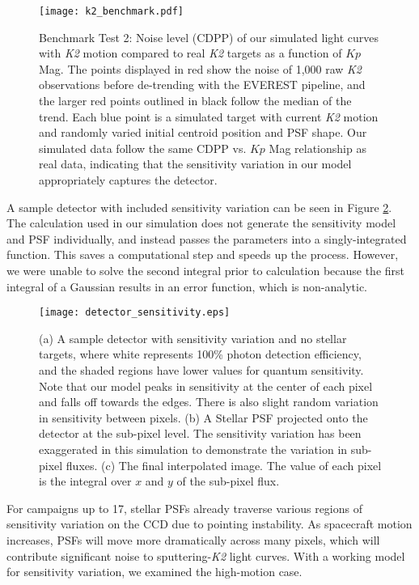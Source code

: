 \documentclass[12pt,preprint]{aastex}
\begin{document}
\begin{figure}[h]
	\centering
	\texttt{[image: k2\_benchmark.pdf]}
	\caption{Benchmark Test 2: Noise level (CDPP) of our simulated light curves with \textit{K2} motion compared to real \textit{K2} targets as a function of $Kp$ Mag. The points displayed in red show the noise of 1,000 raw \textit{K2} observations before de-trending with the EVEREST pipeline, and the larger red points outlined in black follow the median of the trend. Each blue point is a simulated target with current \textit{K2} motion and randomly varied initial centroid position and PSF shape. Our simulated data follow the same CDPP vs. $Kp$ Mag relationship as real data, indicating that the sensitivity variation in our model appropriately captures the detector.}
	\label{fig:1motion}
\end{figure}

A sample detector with included sensitivity variation can be seen in Figure \ref{fig:detector_sensitivity}. The calculation used in our simulation does not generate the sensitivity model and PSF individually, and instead passes the parameters into a singly-integrated function. This saves a computational step and speeds up the process. However, we were unable to solve the second integral prior to calculation because the first integral of a Gaussian results in an error function, which is non-analytic.

\begin{figure}[h]
	\centering
	\texttt{[image: detector\_sensitivity.eps]}
	\caption{(a) A sample detector with sensitivity variation and no stellar targets, where white represents 100\% photon detection efficiency, and the shaded regions have lower values for quantum sensitivity. Note that our model peaks in sensitivity at the center of each pixel and falls off towards the edges. There is also slight random variation in sensitivity between pixels. (b) A Stellar PSF projected onto the detector at the sub-pixel level. The sensitivity variation has been exaggerated in this simulation to demonstrate the variation in sub-pixel fluxes. (c) The final interpolated image. The value of each pixel is the integral over $x$ and $y$ of the sub-pixel flux.}
	\label{fig:detector_sensitivity}
\end{figure}

For campaigns up to 17, stellar PSFs already traverse various regions of sensitivity variation on the CCD due to pointing instability. As spacecraft motion increases, PSFs will move more dramatically across many pixels, which will contribute significant noise to sputtering-\textit{K2} light curves. With a working model for sensitivity variation, we examined the high-motion case.
\end{document}
